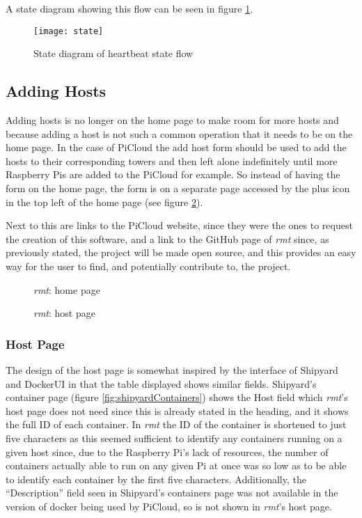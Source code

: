 A state diagram showing this flow can be seen in figure \ref{fig:hbstate}.

\begin{figure}[t]
	\centering
	\texttt{[image: state]}
	\caption{State diagram of heartbeat state flow}
	\label{fig:hbstate}
\end{figure}

\subsection{Adding Hosts}

Adding hosts is no longer on the home page to make room for more hosts and because adding a host is not such a common operation that it needs to be on the home page.
In the case of PiCloud the add host form should be used to add the hosts to their corresponding towers and then left alone indefinitely until more Raspberry Pis are added to the PiCloud for example.
So instead of having the form on the home page, the form is on a separate page accessed by the plus icon in the top left of the home page (see figure \ref{fig:rmtCurrent}).

Next to this are links to the PiCloud website, since they were the ones to request the creation of this software, and a link to the GitHub page of \emph{rmt} since, as previously stated, the project will be made open source, and this provides an easy way for the user to find, and potentially contribute to, the project.

\begin{figure}[t]
	\centering
	\setlength\fboxsep{0pt}
	\setlength\fboxrule{0.5pt}
	\caption{\emph{rmt}: home page}
	\label{fig:rmtCurrent}
\end{figure}

\begin{figure}[t]
	\centering
	\setlength\fboxsep{0pt}
	\setlength\fboxrule{0.5pt}
	\caption{\emph{rmt}: host page}
	\label{fig:rmtHostCurrent}
\end{figure}

\subsubsection{Host Page}

The design of the host page is somewhat inspired by the interface of Shipyard and DockerUI in that the table displayed shows similar fields.
Shipyard's container page (figure \ref{fig:shipyardContainers}) shows the Host field which \emph{rmt}'s host page does not need since this is already stated in the heading, and it shows the full ID of each container.
In \emph{rmt} the ID of the container is shortened to just five characters as this seemed sufficient to identify any containers running on a given host since, due to the Raspberry Pi's lack of resources, the number of containers actually able to run on any given Pi at once was so low as to be able to identify each container by the first five characters.
Additionally, the ``Description'' field seen in Shipyard's containers page was not available in the version of docker being used by PiCloud, so is not shown in \emph{rmt}'s host page.

